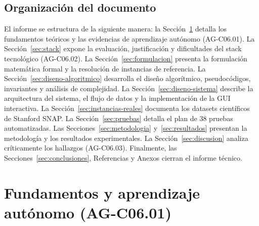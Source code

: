 \documentclass[11pt,a4paper]{article}
\begin{document}
\subsection{Organización del documento}
El informe se estructura de la siguiente manera: la Sección~\ref{sec:fundamentos} detalla los fundamentos teóricos y las evidencias de aprendizaje autónomo (AG-C06.01). La Sección~\ref{sec:stack} expone la evaluación, justificación y dificultades del stack tecnológico (AG-C06.02). La Sección~\ref{sec:formulacion} presenta la formulación matemática formal y la resolución de instancias de referencia. La Sección~\ref{sec:diseno-algoritmico} desarrolla el diseño algorítmico, pseudocódigos, invariantes y análisis de complejidad. La Sección~\ref{sec:diseno-sistema} describe la arquitectura del sistema, el flujo de datos y la implementación de la GUI interactiva. La Sección~\ref{sec:instancias-reales} documenta los datasets científicos de Stanford SNAP. La Sección~\ref{sec:pruebas} detalla el plan de 38 pruebas automatizadas. Las Secciones~\ref{sec:metodologia} y~\ref{sec:resultados} presentan la metodología y los resultados experimentales. La Sección~\ref{sec:discusion} analiza críticamente los hallazgos (AG-C06.03). Finalmente, las Secciones~\ref{sec:conclusiones}, Referencias y Anexos cierran el informe técnico.

\section{Fundamentos y aprendizaje autónomo (AG-C06.01)}
\label{sec:fundamentos}
\end{document}
